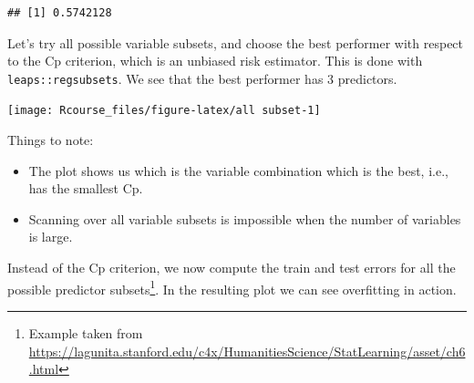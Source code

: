 \documentclass[]{book}
\newenvironment{Shaded}{\begin{snugshade}}{\end{snugshade}}
\newcommand{\KeywordTok}[1]{\textcolor[rgb]{0.13,0.29,0.53}{\textbf{#1}}}
\newcommand{\DataTypeTok}[1]{\textcolor[rgb]{0.13,0.29,0.53}{#1}}
\newcommand{\StringTok}[1]{\textcolor[rgb]{0.31,0.60,0.02}{#1}}
\newcommand{\CommentTok}[1]{\textcolor[rgb]{0.56,0.35,0.01}{\textit{#1}}}
\newcommand{\OperatorTok}[1]{\textcolor[rgb]{0.81,0.36,0.00}{\textbf{#1}}}
\newcommand{\NormalTok}[1]{#1}
\providecommand{\tightlist}{%
  \setlength{\itemsep}{0pt}\setlength{\parskip}{0pt}}
\theoremstyle{definition}
\theoremstyle{definition}
\theoremstyle{definition}
\theoremstyle{remark}
\begin{document}
\begin{verbatim}
## [1] 0.5742128
\end{verbatim}

Let's try all possible variable subsets, and choose the best performer
with respect to the Cp criterion, which is an unbiased risk estimator.
This is done with \texttt{leaps::regsubsets}. We see that the best
performer has 3 predictors.

\begin{Shaded}
\end{Shaded}

\texttt{[image: Rcourse\_files/figure-latex/all subset-1]}

Things to note:

\begin{itemize}
\tightlist
\item
  The plot shows us which is the variable combination which is the best,
  i.e., has the smallest Cp.
\item
  Scanning over all variable subsets is impossible when the number of
  variables is large.
\end{itemize}

Instead of the Cp criterion, we now compute the train and test errors
for all the possible predictor subsets\footnote{Example taken from
  \url{https://lagunita.stanford.edu/c4x/HumanitiesScience/StatLearning/asset/ch6.html}}.
In the resulting plot we can see overfitting in action.
\end{document}
